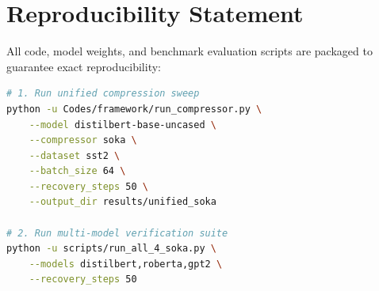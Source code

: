 \section{Reproducibility Statement}
All code, model weights, and benchmark evaluation scripts are packaged to guarantee exact reproducibility:
\begin{lstlisting}[language=bash]
# 1. Run unified compression sweep
python -u Codes/framework/run_compressor.py \
    --model distilbert-base-uncased \
    --compressor soka \
    --dataset sst2 \
    --batch_size 64 \
    --recovery_steps 50 \
    --output_dir results/unified_soka

# 2. Run multi-model verification suite
python -u scripts/run_all_4_soka.py \
    --models distilbert,roberta,gpt2 \
    --recovery_steps 50
\end{lstlisting}
